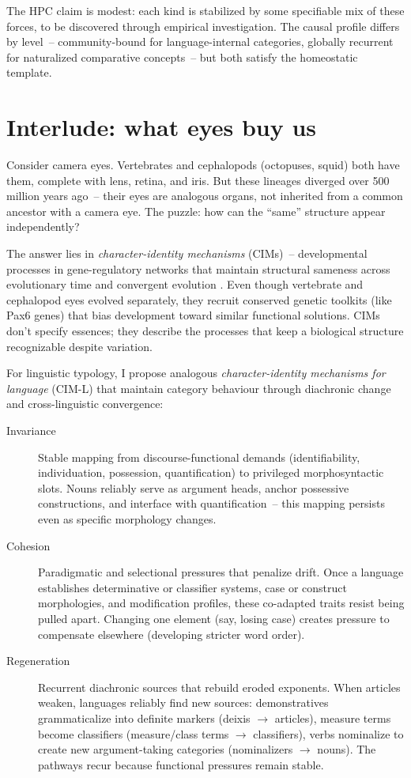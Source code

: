 \documentclass[12pt]{article}
\begin{document}
The HPC claim is modest: each kind is stabilized by some specifiable mix of these forces, to be discovered through empirical investigation. The causal profile differs by level~-- community-bound for language-internal categories, globally recurrent for naturalized comparative concepts~-- but both satisfy the homeostatic template.

\section{Interlude: what eyes buy us}\label{sec:eyes}
Consider camera eyes. Vertebrates and cephalopods (octopuses, squid) both have them, complete with lens, retina, and iris. But  these lineages diverged over 500 million years ago~-- their eyes are analogous organs, not inherited from a common ancestor with a camera eye. The puzzle: how can the \enquote{same} structure appear independently?

The answer lies in \emph{character-identity mechanisms} (CIMs)~-- developmental processes in gene-regulatory networks that maintain structural sameness across evolutionary time and convergent evolution \parencite{ShubinTabinCarroll2009,Wagner2014,DiFriscoLoveWagner2020}. Even though vertebrate and cephalopod eyes evolved separately, they recruit conserved genetic toolkits (like Pax6 genes) that bias development toward similar functional solutions. CIMs don't specify essences; they describe the processes that keep a biological structure recognizable despite variation.

For linguistic typology, I propose analogous \emph{character-identity mechanisms for language} (CIM-L) that maintain category behaviour through diachronic change and cross-linguistic convergence:


\begin{description}
    \item[Invariance] Stable mapping from discourse-functional demands (identifiability, individuation, possession, quantification) to privileged morphosyntactic slots. Nouns reliably serve as argument heads, anchor possessive constructions, and interface with quantification~-- this mapping persists even as specific morphology changes.

    \item[Cohesion] Paradigmatic and selectional pressures that penalize drift. Once a language establishes determinative or classifier systems, case or construct morphologies, and modification profiles, these co-adapted traits resist being pulled apart. Changing one element (say, losing case) creates pressure to compensate elsewhere (developing stricter word order).

    \item[Regeneration] Recurrent diachronic sources that rebuild eroded exponents. When articles weaken, languages reliably find new sources: demonstratives grammaticalize into definite markers (deixis $\to$ articles), measure terms become classifiers (measure/class terms $\to$ classifiers), verbs nominalize to create new argument-taking categories (nominalizers $\to$ nouns). The pathways recur because functional pressures remain stable.
\end{description}
\end{document}

